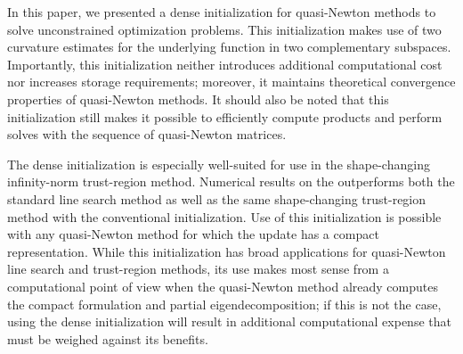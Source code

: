 In this paper, we presented a dense initialization for quasi-Newton methods
to solve unconstrained optimization problems.  This initialization makes
use of two curvature estimates for the underlying function in two
complementary subspaces.  
Importantly, this initialization neither introduces additional
computational cost nor increases storage requirements; moreover,
it maintains theoretical convergence properties of quasi-Newton methods.
It should also be noted that this initialization still
makes it possible to efficiently compute products and perform solves with
the sequence of quasi-Newton matrices.  

The dense initialization is especially well-suited for use in the
shape-changing infinity-norm \LBFGS{} trust-region method. Numerical
results on the 
outperforms both the standard \LBFGS{} line search method as well as the
same shape-changing trust-region method with the conventional
initialization.  Use of this initialization is possible with any
quasi-Newton method for which the update has a compact representation.
While this initialization has broad applications for quasi-Newton line
search and trust-region methods, its use makes most sense from a
computational point of view when the quasi-Newton method already computes
the compact formulation and partial eigendecomposition; if this is not the
case, using the dense initialization will result in additional
computational expense that must be weighed against its benefits.  
